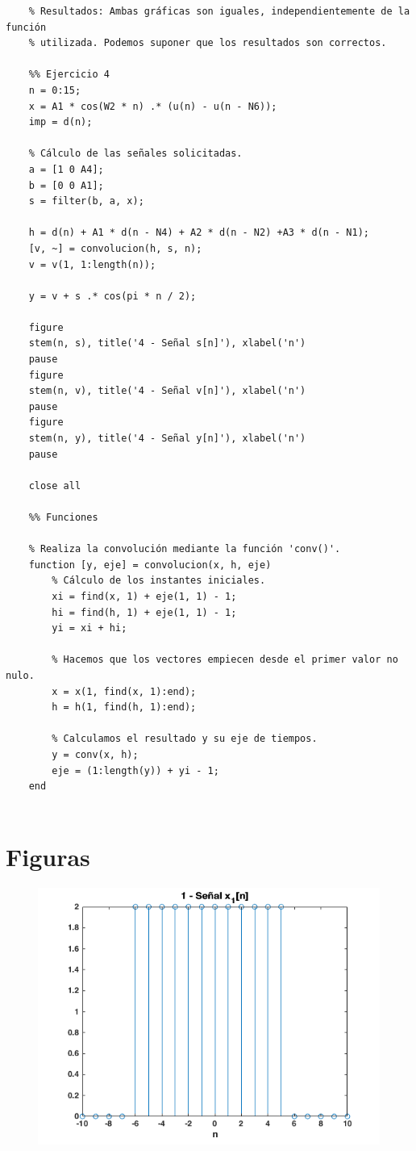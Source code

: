 \documentclass{article}
\begin{document}
\begin{lstlisting}
	% Resultados: Ambas gráficas son iguales, independientemente de la función
	% utilizada. Podemos suponer que los resultados son correctos.
	
	%% Ejercicio 4
	n = 0:15;
	x = A1 * cos(W2 * n) .* (u(n) - u(n - N6));
	imp = d(n);
	
	% Cálculo de las señales solicitadas.
	a = [1 0 A4];
	b = [0 0 A1];
	s = filter(b, a, x);
	
	h = d(n) + A1 * d(n - N4) + A2 * d(n - N2) +A3 * d(n - N1);
	[v, ~] = convolucion(h, s, n);
	v = v(1, 1:length(n));
	
	y = v + s .* cos(pi * n / 2);
	
	figure
	stem(n, s), title('4 - Señal s[n]'), xlabel('n')
	pause
	figure
	stem(n, v), title('4 - Señal v[n]'), xlabel('n')
	pause
	figure
	stem(n, y), title('4 - Señal y[n]'), xlabel('n')
	pause
	
	close all
	
	%% Funciones
	
	% Realiza la convolución mediante la función 'conv()'.
	function [y, eje] = convolucion(x, h, eje)
		% Cálculo de los instantes iniciales.
		xi = find(x, 1) + eje(1, 1) - 1;
		hi = find(h, 1) + eje(1, 1) - 1;
		yi = xi + hi;
	
		% Hacemos que los vectores empiecen desde el primer valor no nulo.
		x = x(1, find(x, 1):end);
		h = h(1, find(h, 1):end);
	
		% Calculamos el resultado y su eje de tiempos.
		y = conv(x, h);
		eje = (1:length(y)) + yi - 1;
	end
	

\end{lstlisting}

\newpage
\pagestyle{plain}
\section{Figuras}

\begin{figure}[h] \caption[Figura 1]{}
	\centering
	\includegraphics[width=\linewidth]{./Figures/01.png}
\end{figure}
\end{document}
